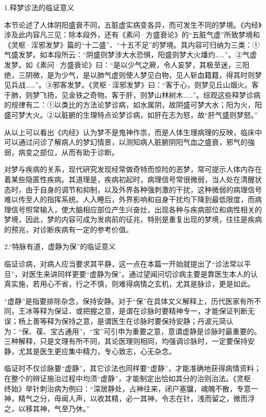 \documentclass[12pt]{ctexbook}
\begin{document}

1.释梦诊法的临证意义

本节论述了人体阴阳盛衰不同，五脏虚实病变各异，而可发生不同的梦境。《内经》涉及此内容凡三见：除本段外，还有《素问·方盛衰论》的“五脏气虚”所致梦境和《灵枢·淫邪发梦》篇的“十二盛”、“十五不足”的梦境。其内容可归纳为三类：①气盛发梦。如本段所云：“阴盛则梦涉大水恐惧，阳盛则梦大火燔灼……”。②气虚发梦。如《素问·方盛衰论》曰：“是以少气之厥，令人妄梦，其极至迷，三阳绝，三阴微，是为少气，是以肺气虚则使人梦见白物，见人斩血籍籍，得其时则梦见兵战……”。③邪客发梦。《灵枢·淫邪发梦》曰：“客于心，则梦见丘山烟火。客于肺，则梦飞扬，见金铁之奇物。客于肝，则梦山林树木……”。综观这些释梦诊病的规律有二：①以类比的方法论梦诊病，如水属阴，故阴盛可梦大水；阳为火，阳盛可梦大火。②以脏腑的生理特点论梦诊病，如肝在志为怒，故“肝气盛则梦怒。”

从以上可以看出《内经》认为梦不是鬼神作祟，而是人体生理病理的反映，临床中可以通过问诊了解病人的梦幻情景，以测知病人脏腑阴阳气血之盛衰，邪气的強弱，病变之部位，从而有助于诊断。

对梦与疾病的关系，现代研究发现经常做奇特而惊险的恶梦，常可提示人体内存在着某些隐匿性疾病。其道理是，疾病初起时，病理信号常很微弱，当人处在清醒状态时，由于自身的调节和抑制，以及外界各种强刺激的干扰，这种微弱的病理信号难以传至人的指挥系统。人入睡后，外界影响和自身干扰均下降到最低限度，而病理信号照常输入，使大脑相应部位产生兴奋灶，出现各种与疾病部位和病性相关的梦境，因此，梦的内容可成为发病前的征兆，特别是重复出现的梦境，往往是疾病的预兆，对诊断疾病有一定的参考价值。

2.“特脉有道，虚静为保”的临证意义

临证诊病，对病人应当要求其平静，这一点在本篇一开始就提出了“诊法常以平旦”，对医生来讲同样更要“虚静为保”。通过望闻问切诊病主要是靠医生本人的认真实施，若用心不省，行之不慎，则难得病情之玄机，尤其是脉诊，更是如此。

“虚静”是指要排除杂念，保持安静。对于“保”在具体文义解释上，历代医家有所不同，王冰等释为保证、或把握之意，是谓在诊脉时要精神专一，才能保证判断无误；杨上善等释为保持之意，是谓医生在诊脉时要保持安静；丹波元简认为：“保、葆、宝古通用”，“宝”可引申为重要之意，意谓虚静是诊脉时最重要的。三种解释，只是文理有所不同，其论医理则相同，均强调诊脉时，一定要保持安静，尤其是医生更应集中精力，专心致志，心无杂念。

临证时不仅诊脉要“虚静”，其它诊法也同样要“虚静”，才能准确地获得病情资料；在整个的辨证施治过程中均须“虚静”，才能制定出恰如其分的治则治法。《灵枢·终始》举针刺治病为例曰：“深居静处，占神往来，闭户塞牖，魂魄不散，专意一神，精气之分，毋闻人声，以收其精，必一其神，令志在针，浅而留之，微而浮之，以移其神，气至乃休。”
\end{document}
